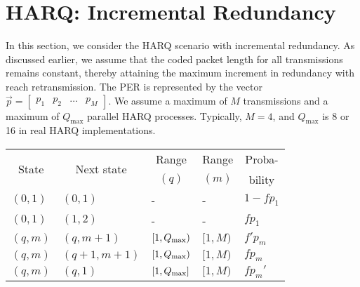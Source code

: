 \section{HARQ: Incremental Redundancy}\label{sec:harq}
In this section, we consider the HARQ scenario with incremental redundancy. 
As discussed earlier, we assume that the coded packet length for all transmissions remains constant, thereby attaining the maximum increment in redundancy with reach retransmission. 
The PER is represented by the vector $\Vec{p}=\begin{bmatrix}p_1 & p_2 & \dots & p_M\end{bmatrix}$. We assume a maximum of $M$ transmissions and a maximum of $Q_{\mathrm{max}}$ parallel HARQ processes. Typically, $M=4$, and $Q_{\mathrm{max}}$ is 8 or 16 in real HARQ implementations.
\begin{table}[b]
\centering
\renewcommand{\arraystretch}{1.25}
\renewcommand{\arraystretch}{1.25}
\begin{tabular}{|l|l|l|l|l|}
\hline
\multicolumn{1}{|c|}{\multirow{2}{*}{State}} & \multicolumn{1}{c|}{\multirow{2}{*}{Next state}} & \multicolumn{1}{c|}{Range} & \multicolumn{1}{c|}{Range} & \multicolumn{1}{c|}{Proba-} \\
\multicolumn{1}{|c|}{}                       & \multicolumn{1}{c|}{}                            & \multicolumn{1}{c|}{$(q)$}   & \multicolumn{1}{c|}{$(m)$}   & \multicolumn{1}{c|}{bility} \\ \hline
$(0,1)$                                      & $(0,1)$                                          &   -                        &   -                        & $1-fp_1$                    \\
$(0,1)$                                      & $(1,2)$                                          &   -                        &   -                        & $fp_1$                      \\
$(q,m)$                                      & $(q,m+1)$                                        & $[1,Q_{\mathrm{max}})$                & $[1,M)$                    & $f'p_m$                     \\
$(q,m)$                                      & $(q+1,m+1)$                                      & $[1,Q_{\mathrm{max}})$                & $[1,M)$                    & $fp_m$                      \\
$(q,m)$                                      & $(q,1)$                                          & $[1,Q_{\mathrm{max}}]$                & $[1,M)$                    & $fp_m'$                     \\

\end{tabular}
\end{table}

